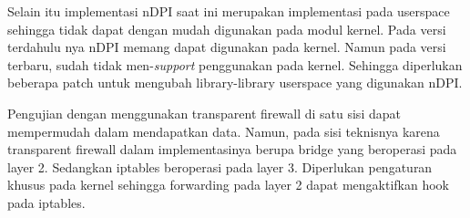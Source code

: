 Selain itu implementasi nDPI saat ini merupakan implementasi pada userspace sehingga tidak dapat dengan mudah digunakan pada modul kernel. Pada versi terdahulu nya nDPI memang dapat digunakan pada kernel. Namun pada versi terbaru, sudah tidak men-\textit{support} penggunakan pada kernel. Sehingga diperlukan beberapa patch untuk mengubah library-library userspace yang digunakan nDPI.

Pengujian dengan menggunakan transparent firewall di satu sisi dapat mempermudah dalam mendapatkan data. Namun, pada sisi teknisnya karena transparent firewall dalam implementasinya berupa bridge yang beroperasi pada layer 2. Sedangkan iptables beroperasi pada layer 3. Diperlukan pengaturan khusus pada kernel sehingga forwarding pada layer 2 dapat mengaktifkan hook pada iptables.